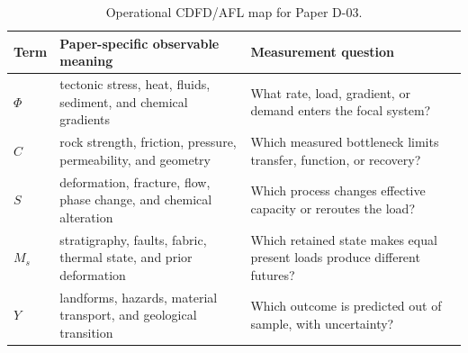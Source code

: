 \documentclass[11pt]{article}
\begin{document}
\begin{table}[htbp]
\centering
\small
\caption{Operational CDFD/AFL map for Paper D-03.}
\begin{tabularx}{\textwidth}{|l|X|X|}
\hline
\textbf{Term} & \textbf{Paper-specific observable meaning} & \textbf{Measurement question} \\
\hline
$\Phi$ & tectonic stress, heat, fluids, sediment, and chemical gradients & What rate, load, gradient, or demand enters the focal system? \\
\hline
$C$ & rock strength, friction, pressure, permeability, and geometry & Which measured bottleneck limits transfer, function, or recovery? \\
\hline
$S$ & deformation, fracture, flow, phase change, and chemical alteration & Which process changes effective capacity or reroutes the load? \\
\hline
$M_s$ & stratigraphy, faults, fabric, thermal state, and prior deformation & Which retained state makes equal present loads produce different futures? \\
\hline
$Y$ & landforms, hazards, material transport, and geological transition & Which outcome is predicted out of sample, with uncertainty? \\
\hline
\end{tabularx}
\end{table}
\end{document}
